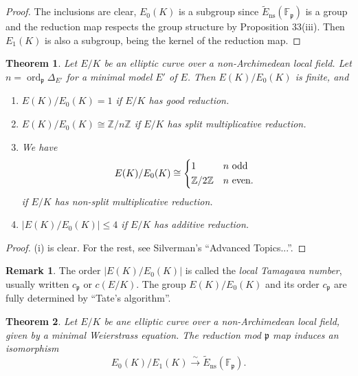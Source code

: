 \documentclass[a4paper]{article}
\newtheorem{theorem}{Theorem}
\theoremstyle{definition}
\newtheorem*{remark}{Remark}
\DeclareMathOperator{\ord}{ord}
\newcommand{\ns}{\mathrm{ns}}
\newcommand{\p}{\mathfrak{p}}
\newcommand{\F}{\mathbb{F}}
\newcommand{\Z}{\mathbb{Z}}
\begin{document}
\begin{proof}
    The inclusions are clear, $E_0(K)$ is a subgroup since $\tilde E_\ns(\F_\p)$
    is a group and the reduction map respects the group structure by Proposition
    33(iii). Then $E_1(K)$ is also a subgroup, being the kernel of the reduction
    map.
\end{proof}

\begin{theorem}
    Let $E/K$ be an elliptic curve over a non-Archimedean local field. Let
    $n=\ord_\p\Delta_{E'}$ for a minimal model $E'$ of $E$. Then $E(K)/E_0(K)$
    is finite, and
    \begin{enumerate}[label=(\roman*)]
        \item $E(K)/E_0(K)=1$ if $E/K$ has good reduction.
        \item $E(K)/E_0(K)\cong\Z/n\Z$ if $E/K$ has split multiplicative
            reduction.
        \item We have
            \begin{equation*}
                E(K)/E_0(K)\cong \begin{dcases*}
                    1 & $n$ odd \\
                    \Z/2\Z & $n$ even.
                \end{dcases*}
            \end{equation*}
            if $E/K$ has non-split multiplicative reduction.
        \item $|E(K)/E_0(K)|\le4$ if $E/K$ has additive reduction.
    \end{enumerate}
\end{theorem}

\begin{proof}
    (i) is clear. For the rest, see Silverman's ``Advanced Topics...''.
\end{proof}

\begin{remark}
    The order $|E(K)/E_0(K)|$ is called the \emph{local Tamagawa number},
    usually written $c_\p$ or $c(E/K)$. The group $E(K)/E_0(K)$ and its order
    $c_\p$ are fully determined by ``Tate's algorithm''.
\end{remark}

\begin{theorem}
    Let $E/K$ be ane elliptic curve over a non-Archimedean local field, given by
    a minimal Weierstrass equation. The reduction mod $\p$ map induces an
    isomorphism
    \begin{equation*}
        E_0(K)/E_1(K) \xrightarrow\sim \tilde E_\ns(\F_\p).
    \end{equation*}
\end{theorem}
\end{document}
